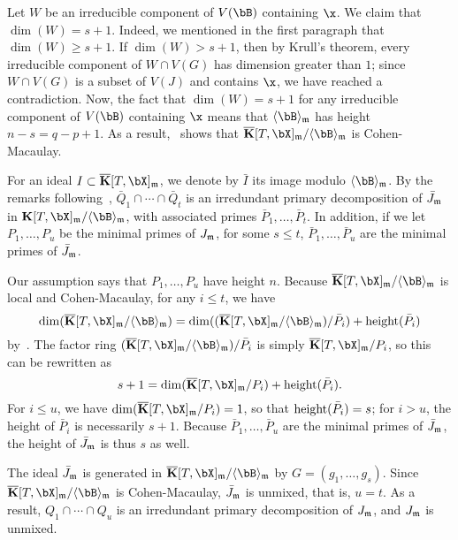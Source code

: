 \documentclass[12pt]{article}
\begin{document}
Let $W$ be an irreducible component of $V(\bB)$ containing $\x$.  We
claim that $\dim(W)=s+1$. Indeed, we mentioned in the first paragraph
that $\dim(W) \ge s+1$. If $\dim(W) > s+1$, then by Krull's theorem,
every irreducible component of $W \cap V(G)$ has dimension greater
than $1$; since $W \cap V(G)$ is a subset of $V(J)$ and contains $\x$,
we have reached a contradiction. Now, the fact that $\dim(W)=s+1$ for
any irreducible component of $V(\bB)$ containing $\x$ means that
$\langle \bB \rangle_\m$ has height $n-s=q-p+1$.  As a
result,~\cite[Theorem~18.18]{Eisenbud95} shows that
$\KKbar[T,\bX]_\m/\langle \bB \rangle_\m$ is Cohen-Macaulay.

For an ideal $I \subset \KKbar[T,\bX]_\m$, we denote by $\bar I$ its
image modulo $\langle \bB \rangle_\m$.  By the remarks
following~\cite[Theorem~IV.5.9]{ZaSa58},
$\bar Q_1 \cap \cdots \cap \bar Q_t$ is an irredundant primary
decomposition of $\bar J_{\mathfrak{m}}$ in
$\KK[T,\bX]_\m/\langle \bB \rangle_\m$, with associated primes
$\bar P_1,\dots,\bar P_t$. In addition, if we let $P_1,\dots,P_u$ be
the minimal primes of $J_{\mathfrak{m}}$, for some $s \le t$,
$\bar P_1,\dots,\bar P_u$ are the minimal primes of $\bar J_{\mathfrak{m}}$.

Our assumption says that $P_1,\dots,P_u$ have height $n$. Because
$\KKbar[T,\bX]_\m/\langle \bB \rangle_\m$ is local and Cohen-Macaulay, for any
$i \le t$, we have 
$$\dim(\KKbar[T,\bX]_\m/\langle \bB \rangle_\m)=\dim((\KKbar[T,\bX]_\m/\langle \bB \rangle_\m) / \bar P_i) + {\rm height}(\bar P_i)$$
by~\cite[Theorem~17.4(i)]{Matsumura86}.
The factor ring $(\KKbar[T,\bX]_\m/\langle \bB \rangle_\m) / \bar P_i$ is simply
$\KKbar[T,\bX]_\m/P_i$, so this can be rewritten as
$$s+1 = \dim(\KKbar[T,\bX]_\m/P_i) + {\rm height}(\bar P_i).$$ For $i\le
u$, we have $\dim(\KKbar[T,\bX]_\m/P_i)=1$, so that ${\rm height}(\bar
P_i)=s$; for $i > u$, the height of $\bar P_i$ is necessarily
$s+1$. Because $\bar P_1,\dots,\bar P_u$ are the minimal primes of
$\bar J_{\mathfrak{m}}$, the height of $\bar J_{\mathfrak{m}}$ is thus $s$ as well.

The ideal $\bar J_{\mathfrak{m}}$ is generated in $\KKbar[T,\bX]_\m/\langle \bB
\rangle_\m$ by $G=(g_1,\dots,g_s)$. Since $\KKbar[T,\bX]_\m/\langle
\bB \rangle_\m$ is Cohen-Macaulay, $\bar J_{\mathfrak{m}}$ is unmixed, that is,
$u=t$.  As a result, $Q_1 \cap \cdots \cap Q_u$ is an irredundant
primary decomposition of $J_{\mathfrak{m}}$, and $J_{\mathfrak{m}}$ is unmixed.

\end{document}
